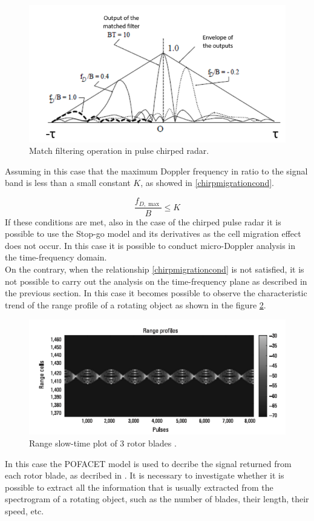 \begin{figure}[h!]
    \centering
    \includegraphics[width=12cm]{Time-frequency analysis-chap3/img/Matching operation.png}
    \caption{Match filtering operation in pulse chirped radar.\cite{galati_radar} }
    \label{Matchingpulsed}
\end{figure}
Assuming in this case that the maximum Doppler frequency in ratio to the signal band is less than a small constant $K$, as showed in \ref{chirpmigrationcond}.

\begin{equation}
\frac{f_{D, \max }}{B} \leq K
\label{chirpmigrationcond}
\end{equation}
If these conditions are met, also in the case of the chirped pulse radar it is possible to use the Stop-go model and its derivatives as the cell migration effect does not occur. In this case it is possible to conduct micro-Doppler analysis in the time-frequency domain.\\
On the contrary, when the relationship \ref{chirpmigrationcond} is not satisfied, it is not possible to carry out the analysis on the time-frequency plane as described in the previous section. In this case it becomes possible to observe the characteristic trend of the range profile of a rotating object as shown in the figure \ref{rangemigrationslowtime}.
\begin{figure}[h!]
    \centering
    \includegraphics[width=16cm]{Time-frequency analysis-chap3/img/range migration slow time.png}
    \caption{Range slow-time plot of 3 rotor blades .\cite{microdoppler_chen} }
    \label{rangemigrationslowtime}
\end{figure}
In this case the POFACET model is used to decribe the signal returned from each rotor blade, as decribed in \cite{microdoppler_chen}. It is necessary to investigate whether it is possible to extract all the information that is usually extracted from the spectrogram of a rotating object, such as the number of blades, their length, their speed, etc.

